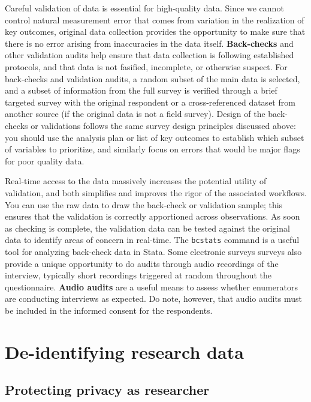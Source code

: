 Careful validation of data is essential for high-quality data.
Since we cannot control natural measurement error
that comes from variation in the realization of key outcomes,
original data collection provides the opportunity to make sure
that there is no error arising from inaccuracies in the data itself.
\textbf{Back-checks} and
other validation audits help ensure that data collection is following established protocols,
and that data is not fasified, incomplete, or otherwise suspect.
For back-checks and validation audits, a random subset of the main data is selected,
and a subset of information from the full survey is
verified through a brief targeted survey with the original respondent
or a cross-referenced dataset from another source (if the original data is not a field survey).
Design of the back-checks or validations follows the same survey design
principles discussed above: you should use the analysis plan
or list of key outcomes to establish which subset of variables to prioritize,
and similarly focus on errors that would be major flags for poor quality data.

Real-time access to the data massively increases the potential utility of validation,
and both simplifies and improves the rigor of the associated workflows.
You can use the raw data to draw the back-check or validation sample;
this ensures that the validation is correctly apportioned across observations.
As soon as checking is complete, the validation data can be tested against
the original data to identify areas of concern in real-time.
The \texttt{bcstats} command is a useful tool for analyzing back-check data in Stata.
Some electronic surveys surveys also provide a unique opportunity
to do audits through audio recordings of the interview,
typically short recordings triggered at random throughout the questionnaire.
\textbf{Audio audits} are a useful means to assess whether enumerators are conducting interviews as expected.
Do note, however, that audio audits must be included in the informed consent for the respondents.

\section{De-identifying research data}
\subsection{Protecting privacy as researcher}

